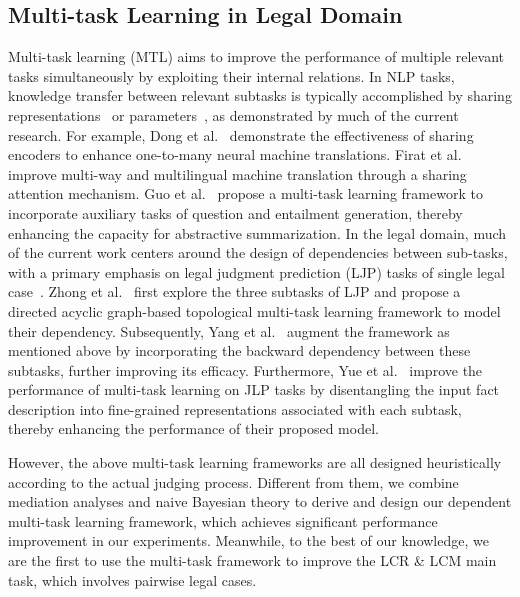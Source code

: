 \subsection{Multi-task Learning in Legal Domain}
Multi-task learning (MTL) aims to improve the performance of multiple relevant tasks simultaneously by exploiting their internal relations.
In NLP tasks, knowledge transfer between relevant subtasks is typically accomplished by sharing representations~\cite{liu2015SharingRep} or parameters~\cite{liu2018SharingParameter}, as demonstrated by much of the current research.
For example, Dong et al.~\cite{dong2015MultiTranlate} demonstrate the effectiveness of sharing encoders to enhance one-to-many neural machine translations.
Firat et al.~\cite{firat2016multi} improve multi-way and multilingual machine translation through a sharing attention mechanism.
Guo et al.~\cite{guo2018soft} propose a multi-task learning framework to incorporate auxiliary tasks of question and entailment generation, thereby enhancing the capacity for abstractive summarization.
In the legal domain, much of the current work centers around the design of dependencies between sub-tasks, with a primary emphasis on legal judgment prediction (LJP) tasks of single legal case~\cite{zhong2018Topology,yang2019Bi-feedback,yue2021Neurjudge,lyu2022CEEN,zhaochun2023multi,zhaochun2023syllogistic,LJP@TOIS2024_XN}.
Zhong et al.~\cite{zhong2018Topology} first explore the three subtasks of LJP and propose a directed acyclic graph-based topological multi-task learning framework to model their dependency.
Subsequently, Yang et al.~\cite{yang2019Bi-feedback} augment the framework as mentioned above by incorporating the backward dependency between these subtasks, further improving its efficacy.
Furthermore, Yue et al.~\cite{yue2021Neurjudge} improve the performance of multi-task learning on JLP tasks by disentangling the input fact description into fine-grained representations associated with each subtask, thereby enhancing the performance of their proposed model.

However, the above multi-task learning frameworks are all designed heuristically according to the actual judging process.
Different from them, we combine mediation analyses and naive Bayesian theory to derive and design our dependent multi-task learning framework, which achieves significant performance improvement in our experiments.
Meanwhile, to the best of our knowledge, we are the first to use the multi-task framework to improve the LCR \& LCM main task, which involves pairwise legal cases.